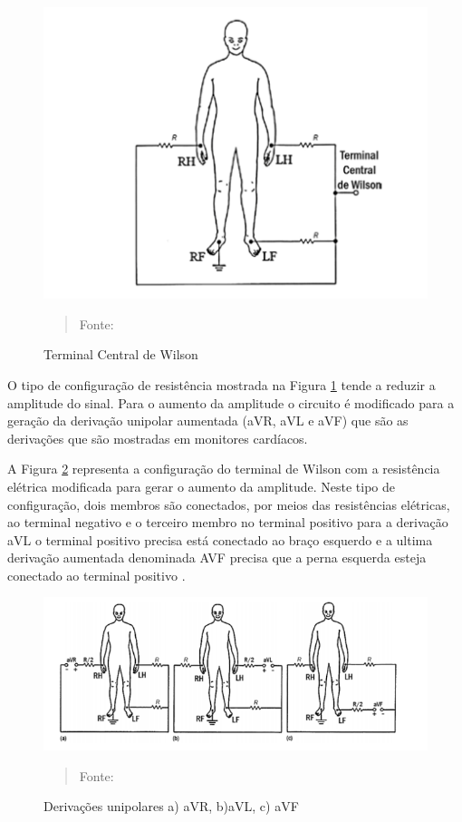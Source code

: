 \documentclass[12pt, a4paper]{article}
\begin{document}
\begin{figure}[H]
\begin{center}
			\caption{Terminal Central de Wilson}
			\includegraphics[width=.5\textwidth]{Figuras/WCT.PNG}
            \vspace*{\fill} 
            \begin{quote} 
            \centering 
            Fonte: \cite{webster}
            \end{quote}
            \vspace*{\fill}
			\label{fig:ab}
\end{center}
\end{figure}
O tipo de configuração de resistência mostrada na Figura \ref{fig:ab} tende a reduzir a amplitude do sinal. Para o aumento da amplitude o  circuito é modificado para a geração da derivação unipolar aumentada (aVR, aVL e aVF) que são as derivações que são mostradas em monitores cardíacos.

A Figura \ref{fig:aca} representa a configuração do terminal de Wilson com a resistência elétrica modificada para gerar o aumento da amplitude. Neste tipo de configuração, dois membros são conectados, por meios das resistências elétricas, ao terminal negativo e o terceiro membro no terminal positivo para a derivação aVL o terminal positivo precisa está conectado ao braço esquerdo e a ultima derivação aumentada denominada AVF precisa que a perna esquerda esteja conectado ao terminal positivo \cite{guyton}. 

\begin{figure}[!htpb]
\begin{center}
			\caption{Derivações unipolares a) aVR, b)aVL, c) aVF }
			\includegraphics[width=.5\textwidth]{Figuras/avr.PNG}
            \vspace*{\fill} 
            \begin{quote} 
            \centering 
            Fonte: \cite{webster}
            \end{quote}
            \vspace*{\fill}
			\label{fig:aca}
\end{center}
\end{figure}
\end{document}
